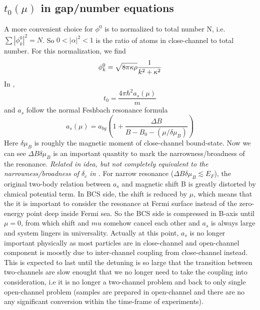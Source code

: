 \subsection{$t_0(\mu)$ in gap/number equations}
A more convenient choice for $\phi^{0}$ is to normalized to total number N, i.e. $\sum|\phi^{0}_{k}|^{2}=N$.  So $0<|\alpha|^{2}<1$ is the ratio of atoms in close-channel to total number.  For this normalization, we find 
\begin{equation}
\phi^{0}_{k}=\sqrt{8\pi\kappa\rho}\frac{1}{k^{2}+\kappa^{2}}
\end{equation}
In , 
\[
t_{0}=\frac{4\pi\hbar^{2}a_{s}(\mu)}{m}
\]
and $a_{s}$ follow the normal Feshbach resonance formula
\begin{equation}
a_{s}(\mu)=a_{bg}(1+\frac{\Delta{B}}{B-B_{0}-(\mu/\delta\mu_{B})})
\end{equation}
Here $\delta\mu_{B}$ is roughly the magnetic moment of close-channel bound-state.   
Now we can see $\Delta{B}\delta\mu_B$ is an important quantity to mark the narrowness/broadness of the resonance.  \emph{Related in idea, but not completely equivalent to the narrowness/broadness of $\delta_c$ in \cite{Leggett}.} For narrow resonance ($\Delta{B}\delta\mu_B\lesssim{E_F}$), the original two-body relation between $a_s$ and magnetic shift B is greatly distorted by chmical potential term.  In BCS side, the shift is reduced by $\mu$, which means that the it is important to consider the resonance at Fermi surface instead of the zero-energy point deep inside Fermi sea.  So the BCS side is compressed in B-axis until $\mu=0$, from which shift and $mu$ somehow cancel each other and $a_s$ is always large and system lingers in universality.  Actually at this point, $a_s$ is no longer important physically as most particles are in close-channel and open-channel component is moostly due to inter-channel coupling from close-channel instead. This is expected to last until the detuning is so large that the transition between two-channels are slow enought that we no longer need to take the coupling into consideration, i.e it is no longer a two-channel problem and back to only single open-channel problem (samples are prepared in open-channel and there are no any significant conversion within the time-frame of experiments).  

